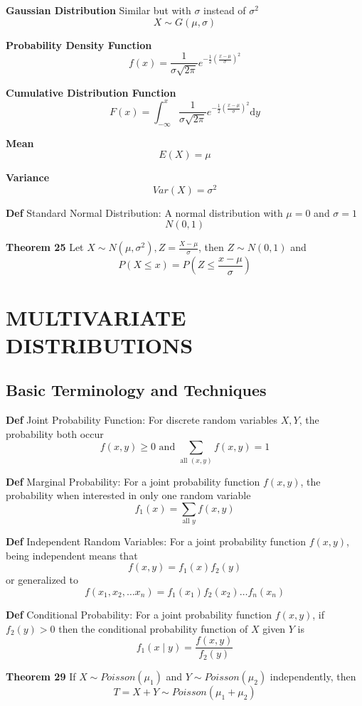 \documentclass[11pt,notitlepage]{report}
\begin{document}
\textbf{Gaussian Distribution} Similar but with $\sigma$ instead of $\sigma^2$
$$X \sim G(\mu, \sigma)$$

\textbf{Probability Density Function}
$$f(x) = \frac{1}{\sigma\sqrt{2\pi}}e^{-\frac{1}{2}\left(\frac{x-\mu}{\sigma}\right)^2}$$

\textbf{Cumulative Distribution Function}
$$F(x) = \int_{-\infty}^x  \frac{1}{\sigma\sqrt{2\pi}}e^{-\frac{1}{2}\left(\frac{x-\mu}{\sigma}\right)^2} \mathrm{d}y$$

\textbf{Mean}
$$E(X) = \mu$$

\textbf{Variance}
$$Var(X) = \sigma^2$$

\textbf{Def} Standard Normal Distribution: A normal distribution with $\mu = 0$ and $\sigma = 1$
$$N(0, 1)$$

\textbf{Theorem 25} Let $X \sim N(\mu, \sigma^2), Z = \frac{X - \mu}{\sigma}$, then $Z \sim N(0, 1)$ and
$$P(X \leq x) = P(Z \leq \frac{x-\mu}{\sigma})$$



\chapter{MULTIVARIATE DISTRIBUTIONS}

\section{Basic Terminology and Techniques}

\textbf{Def} Joint Probability Function: For discrete random variables $X, Y$, the probability both occur
$$f(x, y) \geq 0 \text{ and }\sum_{\text{all }(x, y)}f(x, y) = 1$$

\textbf{Def} Marginal Probability: For a joint probability function $f(x, y)$, the probability when interested in only one random variable
$$f_1(x) = \sum_{\text{all } y}f(x, y)$$

\textbf{Def} Independent Random Variables: For a joint probability function $f(x, y)$, being independent means that
$$f(x, y) = f_1(x) f_2(y)$$
or generalized to
$$f(x_1, x_2, \dots x_n) = f_1(x_1) f_2(x_2) \dots f_n(x_n)$$

\textbf{Def} Conditional Probability: For a joint probability function $f(x, y)$, if $f_2(y) > 0$ then the conditional probability function of $X$ given $Y$ is
$$f_1(x \mid y) = \frac{f(x, y)}{f_2(y)}$$

\textbf{Theorem 29} If $X \sim Poisson(\mu_1)$ and $Y \sim Poisson(\mu_2)$ independently, then
$$T = X + Y \sim Poisson(\mu_1 + \mu_2)$$
\end{document}

